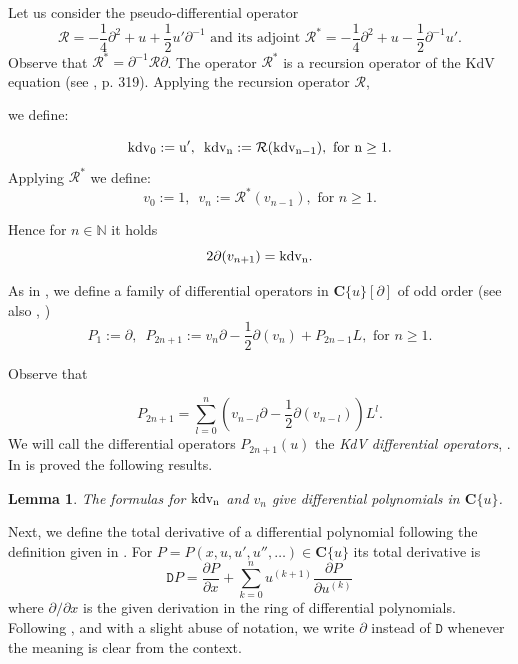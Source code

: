 \documentclass[a4paper,12pt]{article}
\newcommand{\cR}{\mathcal{R}}
\newcommand{\bbN}{\mathbb{N}}
\newcommand{\coC}{\mathbf{C}}
\def\kdv{\rm kdv}
\def\D{\texttt{D}}
\newtheorem{lem}[thm]{Lemma}
\begin{document}
Let us consider the pseudo-differential operator
\begin{equation}\label{eq-recursion}
\cR=-\frac{1}{4}\partial^2+u+\frac{1}{2}u'\partial^{-1}\mbox{ and its adjoint }
\cR^*=-\frac{1}{4}\partial^2+u-\frac{1}{2}\partial^{-1}u'.
\end{equation}
Observe that $\cR^*=\partial^{-1}\cR\partial$. The operator $\cR^*$ is a recursion operator of the KdV equation (see \cite{olver1993applications}, p. 319). Applying the recursion operator $\cR$, 

we define:


\begin{equation}\label{eq-kdv}
\kdv_0:=u',\,\,\, \kdv_n:=\cR(\kdv_{n-1}),\mbox{ for }n\geq 1.
\end{equation}
Applying $\cR^*$ we define:
\begin{equation}\label{eq-fn}
v_0:=1,\,\,\, v_n:=\cR^*(v_{n-1}),\mbox{ for }n\geq 1.
\end{equation}


Hence for $n\in\bbN$ it holds
\begin{equation}\label{eq-vkdv}
2\partial(v_{n+1})=\kdv_n.
\end{equation}

As in \cite{GH, MRZ1}, we define a family of differential operators in $\coC\{u\}[\partial]$ of odd order (see also \cite{Dikii}, \cite{Novikov})
\begin{equation}\label{eq-A2s+1}
P_1:=\partial,\,\,\,P_{2n+1}:=v_{n}\partial-\frac{1}{2}\partial(v_{n})+P_{2n-1}L,\mbox{ for }n\geq 1.
\end{equation}


Observe that

\begin{equation}\label{eq-P2n+1}
P_{2n+1}=\sum_{l=0}^n\left(v_{n-l}\partial-\frac{1}{2}\partial(v_{n-l})\right)L^l.
\end{equation}
We will call the differential operators $P_{2n+1}(u)$ the {\it KdV differential operators}, \cite{MRZ1}. In \cite{MRZ1} is proved the following results.




\begin{lem}\label{lem-kdv}
The formulas for  $\kdv_n$ and $v_n$ give differential polynomials in $\coC\{u\}$.
\end{lem}
Next, we define the total derivative of a differential polynomial following the definition given in \cite{olver1993applications}. For $P=P(x,u,u' ,u'',\dots)\in \coC \{ u\}$ its total derivative is
\begin{equation}
    \D P = \dfrac{\partial P}{\partial x}
    +
    \sum_{k=0}^n u^{(k+1)} \dfrac{\partial P}{\partial u^{(k)}}
\end{equation}
where $\partial / \partial x $ is the given derivation in the ring of differential polynomials. Following \cite{Kolchin1973}, and with a slight abuse of notation, we write $\partial $ instead of $\D$  whenever the meaning is clear from the context.
\end{document}
